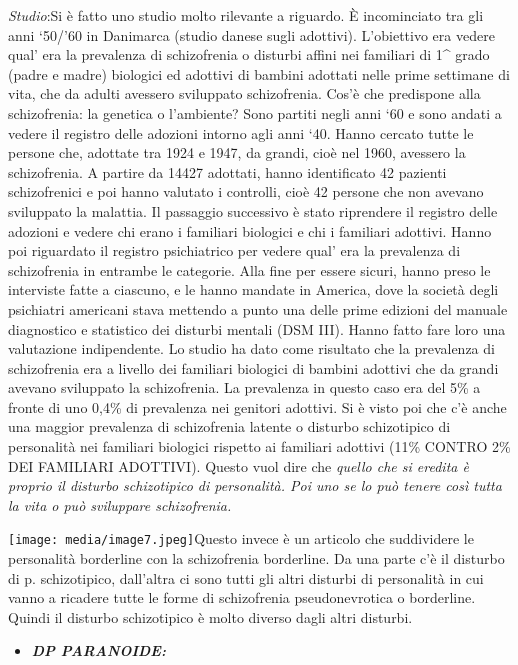 \documentclass[]{article}
\begin{document}
\emph{Studio}:Si è fatto uno studio molto rilevante a riguardo. È
incominciato tra gli anni `50/'60 in Danimarca (studio danese sugli
adottivi). L'obiettivo era vedere qual' era la prevalenza di
schizofrenia o disturbi affini nei familiari di 1\^{} grado (padre e
madre) biologici ed adottivi di bambini adottati nelle prime settimane
di vita, che da adulti avessero sviluppato schizofrenia. Cos'è che
predispone alla schizofrenia: la genetica o l'ambiente? Sono partiti
negli anni `60 e sono andati a vedere il registro delle adozioni intorno
agli anni `40. Hanno cercato tutte le persone che, adottate tra 1924 e
1947, da grandi, cioè nel 1960, avessero la schizofrenia. A partire da
14427 adottati, hanno identificato 42 pazienti schizofrenici e poi hanno
valutato i controlli, cioè 42 persone che non avevano sviluppato la
malattia. Il passaggio successivo è stato riprendere il registro delle
adozioni e vedere chi erano i familiari biologici e chi i familiari
adottivi. Hanno poi riguardato il registro psichiatrico per vedere qual'
era la prevalenza di schizofrenia in entrambe le categorie. Alla fine
per essere sicuri, hanno preso le interviste fatte a ciascuno, e le
hanno mandate in America, dove la società degli psichiatri americani
stava mettendo a punto una delle prime edizioni del manuale diagnostico
e statistico dei disturbi mentali (DSM III). Hanno fatto fare loro una
valutazione indipendente. Lo studio ha dato come risultato che la
prevalenza di schizofrenia era a livello dei familiari biologici di
bambini adottivi che da grandi avevano sviluppato la schizofrenia. La
prevalenza in questo caso era del 5\% a fronte di uno 0,4\% di
prevalenza nei genitori adottivi. Si è visto poi che c'è anche una
maggior prevalenza di schizofrenia latente o disturbo schizotipico di
personalità nei familiari biologici rispetto ai familiari adottivi (11\%
CONTRO 2\% DEI FAMILIARI ADOTTIVI). Questo vuol dire che \emph{quello
che si eredita è proprio il disturbo schizotipico di personalità. Poi
uno se lo può tenere così tutta la vita o può sviluppare schizofrenia.}

\texttt{[image: media/image7.jpeg]}Questo
invece è un articolo che suddividere le personalità borderline con la
schizofrenia borderline. Da una parte c'è il disturbo di p.
schizotipico, dall'altra ci sono tutti gli altri disturbi di personalità
in cui vanno a ricadere tutte le forme di schizofrenia pseudonevrotica o
borderline. Quindi il disturbo schizotipico è molto diverso dagli altri
disturbi.

\begin{itemize}
\item
  \textbf{\emph{DP PARANOIDE:}}
\end{itemize}
\end{document}
